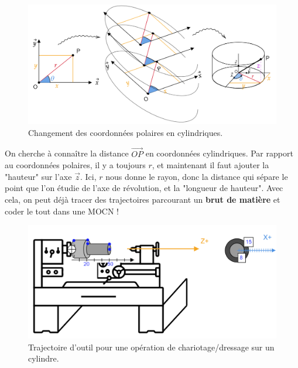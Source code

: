 \documentclass[
	11pt, %
	fleqn, %
	a4paper, %
]{LegrandOrangeBook}
\begin{document}
\begin{figure}[H] %
	\centering %
	\includegraphics[width=1\textwidth]{Images/cyl1.png} %
	\caption{Changement des coordonnées polaires en cylindriques.}
	\label{cyl1} %
\end{figure}

On cherche à connaître la distance $\Vec{OP}$ en coordonnées cylindriques. Par rapport au coordonnées polaires, il y a toujours $r$, et maintenant il faut ajouter la "hauteur" sur l'axe $\Vec{z}$. Ici, $r$ nous donne le rayon, donc la distance qui sépare le point que l'on étudie de l'axe de révolution, et la "longueur de hauteur". Avec cela, on peut déjà tracer des trajectoires parcourant un \textbf{brut de matière} et coder le tout dans une MOCN !

\begin{figure}[H] %
	\centering %
	\includegraphics[width=1\textwidth]{Images/cyl2.png} %
	\caption{Trajectoire d'outil pour une opération de chariotage/dressage sur un cylindre.}
	\label{cyl2} %
\end{figure}
\end{document}
